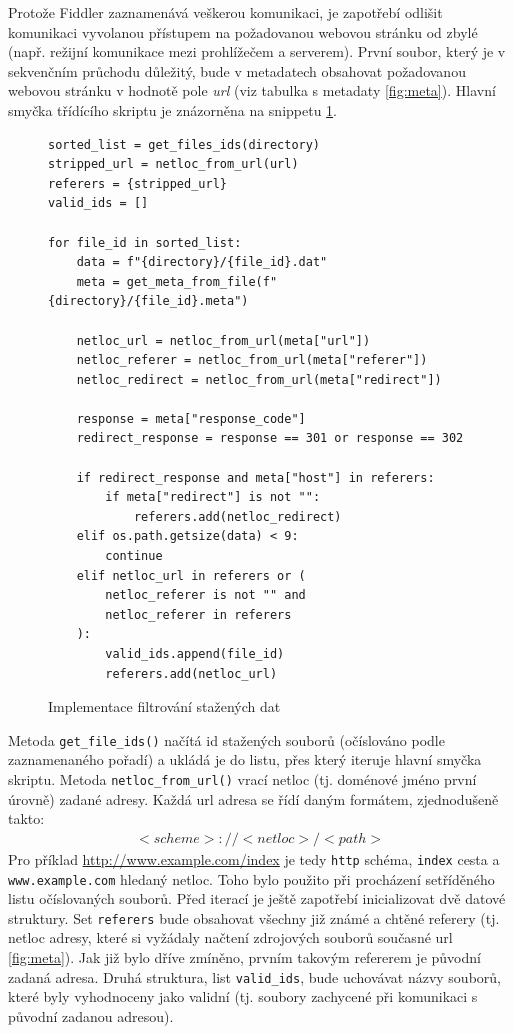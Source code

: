 \documentclass[thesis=M,czech,hidelinks]{FITthesis}[2013/05/06]
\begin{document}
Protože Fiddler zaznamenává veškerou komunikaci, je zapotřebí odlišit komunikaci vyvolanou přístupem na požadovanou webovou stránku od zbylé (např. režijní komunikace mezi prohlížečem a serverem). První soubor, který je v sekvenčním průchodu důležitý, bude v metadatech obsahovat požadovanou webovou stránku v hodnotě pole \textit{url} (viz tabulka s metadaty \ref{fig:meta}). Hlavní smyčka třídícího skriptu je znázorněna na snippetu \ref{snip:filter}. 

\begin{figure}[h]               
\begin{verbatim}
sorted_list = get_files_ids(directory)
stripped_url = netloc_from_url(url)
referers = {stripped_url}
valid_ids = []

for file_id in sorted_list:
    data = f"{directory}/{file_id}.dat"
    meta = get_meta_from_file(f"{directory}/{file_id}.meta")

    netloc_url = netloc_from_url(meta["url"])
    netloc_referer = netloc_from_url(meta["referer"])
    netloc_redirect = netloc_from_url(meta["redirect"])

    response = meta["response_code"]
    redirect_response = response == 301 or response == 302
    
    if redirect_response and meta["host"] in referers:
        if meta["redirect"] is not "":
            referers.add(netloc_redirect)
    elif os.path.getsize(data) < 9:
        continue
    elif netloc_url in referers or (
        netloc_referer is not "" and 
        netloc_referer in referers
    ):
        valid_ids.append(file_id)
        referers.add(netloc_url)

\end{verbatim}      
\caption{Implementace filtrování stažených dat}
\label{snip:filter}
\end{figure}

Metoda \texttt{get_file_ids()} načítá id stažených souborů (očíslováno podle zaznamenaného pořadí) a ukládá je do listu, přes který iteruje hlavní smyčka skriptu. Metoda \texttt{netloc_from_url()} vrací netloc (tj. doménové jméno první úrovně) zadané adresy. Každá url adresa se řídí daným formátem, zjednodušeně takto:
\begin{eqnarray}
<scheme>://<netloc>/<path>
\end{eqnarray}
Pro příklad \url{http://www.example.com/index} je tedy \texttt{http} schéma, \texttt{index} cesta a \texttt{www.example.com} hledaný netloc. Toho bylo použito při procházení setříděného listu očíslovaných souborů. Před iterací je ještě zapotřebí inicializovat dvě datové struktury. Set \texttt{referers} bude obsahovat všechny již známé a chtěné referery (tj. netloc adresy, které si vyžádaly načtení zdrojových souborů současné url \ref{fig:meta}). Jak již bylo dříve zmíněno, prvním takovým refererem je původní zadaná adresa. Druhá struktura, list \texttt{valid_ids}, bude uchovávat názvy souborů, které byly vyhodnoceny jako validní (tj. soubory zachycené při komunikaci s původní zadanou adresou).
\end{document}
